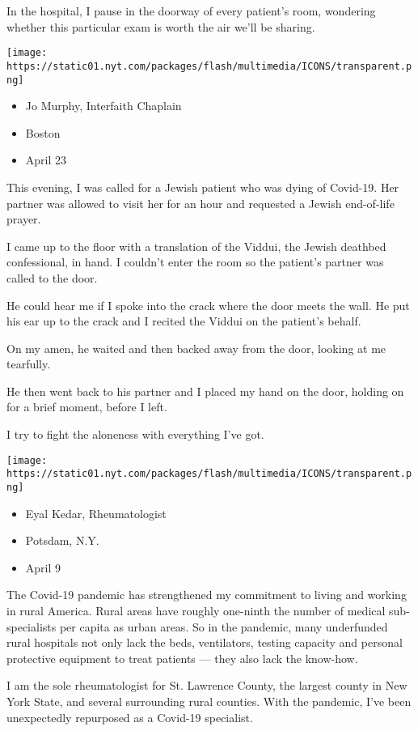 In the hospital, I pause in the doorway of every patient's room,
wondering whether this particular exam is worth the air we'll be
sharing.

\texttt{[image: https://static01.nyt.com/packages/flash/multimedia/ICONS/transparent.png]}

\begin{itemize}
\tightlist
\item
  Jo Murphy, Interfaith Chaplain
\item
  Boston
\item
  April 23
\end{itemize}

This evening, I was called for a Jewish patient who was dying of
Covid-19. Her partner was allowed to visit her for an hour and requested
a Jewish end-of-life prayer.

I came up to the floor with a translation of the Viddui, the Jewish
deathbed confessional, in hand. I couldn't enter the room so the
patient's partner was called to the door.

He could hear me if I spoke into the crack where the door meets the
wall. He put his ear up to the crack and I recited the Viddui on the
patient's behalf.

On my amen, he waited and then backed away from the door, looking at me
tearfully.

He then went back to his partner and I placed my hand on the door,
holding on for a brief moment, before I left.

I try to fight the aloneness with everything I've got.

\texttt{[image: https://static01.nyt.com/packages/flash/multimedia/ICONS/transparent.png]}

\begin{itemize}
\tightlist
\item
  Eyal Kedar, Rheumatologist
\item
  Potsdam, N.Y.
\item
  April 9
\end{itemize}

The Covid-19 pandemic has strengthened my commitment to living and
working in rural America. Rural areas have roughly one-ninth the number
of medical sub-specialists per capita as urban areas. So in the
pandemic, many underfunded rural hospitals not only lack the beds,
ventilators, testing capacity and personal protective equipment to treat
patients --- they also lack the know-how.

I am the sole rheumatologist for St. Lawrence County, the largest county
in New York State, and several surrounding rural counties. With the
pandemic, I've been unexpectedly repurposed as a Covid-19 specialist.

